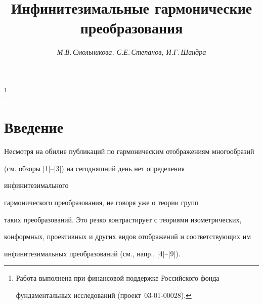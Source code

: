  


\author{\it М.В.\,Смольникова, С.Е.\,Степанов, И.Г.\,Шандра} 




\title{Инфинитезимальные гармонические преобразования} 


\thanks{Работа выполнена при финансовой поддержке Российского фонда 


фундаментальных исследований (проект \No\,03-01-00028).} 


 


\date{} 




\pagestyle{plain} %


 




\maketitle 


\label{begin} 


 


 


 


 


\section*{Введение} 


 


Несмотря на обилие публикаций по гармоническим отображениям многообразий 


(см. обзоры [1]--[3]) на сегодняшний день нет определения 


инфинитезимального 


гармонического преобразования, не говоря уже о теории групп 


таких преобразований. Это резко контрастирует с теориями изометрических, 


конформных, проективных и других видов отображений и соответствующих им 


инфинитезимальных преобразований (см., напр., [4]--[9]). 


 


